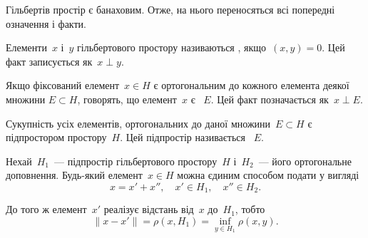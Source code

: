 Гільбертів простір є банаховим. Отже, на нього
переносяться всі попередні означення і факти.

\begin{definition}
Елементи~$x$ і~$y$ гільбертового простору
називаються , якщо~$(x, y) = 0$.
Цей факт записується як~$x \perp y$.
\end{definition}

\begin{definition}
Якщо фіксований елемент~$x \in H$ є
ортогональним до кожного елемента деякої множини
$E \subset H$, говорять, що елемент~$x$ є
~$E$.
Цей факт позначається як~$x \perp E$.
\end{definition}

\begin{definition}
Сукупність усіх елементів, ортогональних до
даної множини~$E \subset H$ є підпростором простору~$H$.
Цей підпростір називається ~$E$.
\end{definition}

\begin{theorem}[Релліха]
Нехай~$H_1$~--- підпростір гільбертового
простору~$H$ і~$H_2$~--- його ортогональне доповнення.
Будь-який елемент~$x \in H$ можна єдиним способом
подати у вигляді
\begin{equation}
    \label{eq:16.5}
    x = x' + x'', \quad x' \in H_1, \quad x'' \in H_2.
\end{equation}

До того ж елемент~$x'$ реалізує відстань від~$x$ до~$H_1$,
тобто
\begin{equation*}
    \|x - x'\| = \rho(x, H_1) = \inf_{y \in H_1} \rho(x, y).
\end{equation*}
\end{theorem}

